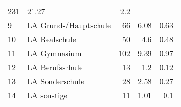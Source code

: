 \begin{longtable}{lXrrr}
       \num{231} &
       \num[round-mode=places,round-precision=2]{21.27} &
         \num[round-mode=places,round-precision=2]{2.2} \\

     9 &
     \multicolumn{1}{X}{ LA Grund-/Hauptschule   } &


       \num{66} &
       \num[round-mode=places,round-precision=2]{6.08} &
         \num[round-mode=places,round-precision=2]{0.63} \\

     10 &
     \multicolumn{1}{X}{ LA Realschule   } &


       \num{50} &
       \num[round-mode=places,round-precision=2]{4.6} &
         \num[round-mode=places,round-precision=2]{0.48} \\

     11 &
     \multicolumn{1}{X}{ LA Gymnasium   } &


       \num{102} &
       \num[round-mode=places,round-precision=2]{9.39} &
         \num[round-mode=places,round-precision=2]{0.97} \\

     12 &
     \multicolumn{1}{X}{ LA Berufsschule   } &


       \num{13} &
       \num[round-mode=places,round-precision=2]{1.2} &
         \num[round-mode=places,round-precision=2]{0.12} \\

     13 &
     \multicolumn{1}{X}{ LA Sonderschule   } &


       \num{28} &
       \num[round-mode=places,round-precision=2]{2.58} &
         \num[round-mode=places,round-precision=2]{0.27} \\

     14 &
     \multicolumn{1}{X}{ LA sonstige   } &


       \num{11} &
       \num[round-mode=places,round-precision=2]{1.01} &
         \num[round-mode=places,round-precision=2]{0.1} \\


\end{longtable}
